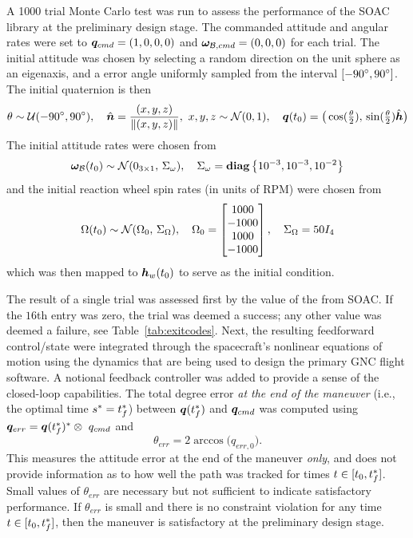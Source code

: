 \documentclass[10pt]{article}
\begin{document}
A 1000 trial Monte Carlo test was run to assess the performance of the SOAC library at the preliminary design stage. The commanded attitude and angular rates were set to $\bm{q}_{cmd} = (1,0,0,0)$ and $\bm{\omega}_{\mathcal{B},cmd}=(0,0,0)$ for each trial. The initial attitude was chosen by selecting a random direction on the unit sphere as an eigenaxis, and a error angle uniformly sampled from the interval $[-90^{\circ},90^{\circ}]$. The initial quaternion is then
\begin{equation}
\theta \sim \mathcal{U}(-90^{\circ},90^{\circ}), \quad \hat{\bm{n}} = \frac{(x,y,z)}{\|(x,y,z)\|}, \ x,y,z\sim\mathcal{N}(0,1), \quad \bm{q}(t_0) = \big(\cos(\tfrac{\theta}{2}),\,\sin(\tfrac{\theta}{2})\hat{\bm{h}} \big)
\end{equation} 
The initial attitude rates were chosen from
\begin{equation}
\bm{\omega}_{\mathcal{B}}(t_0) \sim \mathcal{N}(0_{3 \times 1},\,\Sigma_{\omega}), \quad \Sigma_{\omega} = \mathop{\bf diag}\left\lbrace 10^{-3},10^{-3},10^{-2} \right\rbrace
\end{equation}
and the initial reaction wheel spin rates (in units of RPM) were chosen from
\begin{equation}
\Omega(t_0) \sim \mathcal{N}(\Omega_0,\,\Sigma_{\Omega}), \quad \Omega_0 = \begin{bmatrix}
1000 \\ -1000 \\ 1000 \\ -1000
\end{bmatrix}, \quad \Sigma_{\Omega} = 50I_{4}
\end{equation}
which was then mapped to $\bm{h}_w(t_0)$ to serve as the initial condition. 

The result of a single trial was assessed first by the value of the  from SOAC. If the $16$th entry was zero, the trial was deemed a success; any other value was deemed a failure, see Table~\ref{tab:exitcodes}. Next, the resulting feedforward control/state were integrated through the spacecraft's nonlinear equations of motion using the dynamics that are being used to design the primary GNC flight software. A notional feedback controller was added to provide a sense of the closed-loop capabilities. The total degree error \textit{at the end of the maneuver} (i.e., the optimal time $s^* = t_f^*$) between $\bm{q}(t_f^*)$ and $\bm{q}_{cmd}$ was computed using $\bm{q}_{err} = \bm{q}(t_f^*)^* \otimes\ q_{cmd}$ and
\begin{equation}
\theta_{err} = 2 \arccos \big( q_{err,0} \big).
\end{equation} 
This measures the attitude error at the end of the maneuver \textit{only}, and does not provide information as to how well the path was tracked for times $t\in[t_0,t_f^*]$. Small values of $\theta_{err}$ are necessary but not sufficient to indicate satisfactory performance. If $\theta_{err}$ is small and there is no constraint violation for any time $t\in[t_0,t_f^*]$, then the maneuver is satisfactory at the preliminary design stage. 
\end{document}
